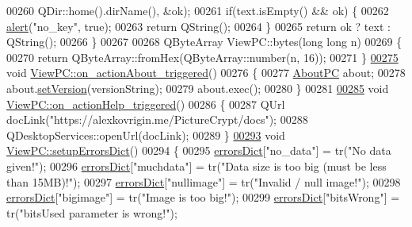 \begin{DoxyCode}
00260                                          QDir::home().dirName(), &ok);
00261     \textcolor{keywordflow}{if}(text.isEmpty() && ok) \{
00262         \hyperlink{class_view_p_c_a7c467169467789561078abc9d4fe57bd}{alert}(\textcolor{stringliteral}{"no\_key"}, \textcolor{keyword}{true});
00263         \textcolor{keywordflow}{return} QString();
00264     \}
00265     \textcolor{keywordflow}{return} ok ? text : QString();
00266 \}
00267 
00268 QByteArray ViewPC::bytes(\textcolor{keywordtype}{long} \textcolor{keywordtype}{long} n)
00269 \{
00270     \textcolor{keywordflow}{return} QByteArray::fromHex(QByteArray::number(n, 16));
00271 \}
\hypertarget{viewpc_8cpp_source.tex_l00275}{}\hyperlink{class_view_p_c_a09a46da4d492eb3dde88f35dc58c997b}{00275} \textcolor{keywordtype}{void} \hyperlink{class_view_p_c_a09a46da4d492eb3dde88f35dc58c997b}{ViewPC::on\_actionAbout\_triggered}()
00276 \{
00277     \hyperlink{class_about_p_c}{AboutPC} about;
00278     about.\hyperlink{class_about_p_c_aa3815d4826d0c8d87122449537a0a4d5}{setVersion}(versionString);
00279     about.exec();
00280 \}
00281 
\hypertarget{viewpc_8cpp_source.tex_l00285}{}\hyperlink{class_view_p_c_a0d252ff4829260c6c76769fbd24b7cd7}{00285} \textcolor{keywordtype}{void} \hyperlink{class_view_p_c_a0d252ff4829260c6c76769fbd24b7cd7}{ViewPC::on\_actionHelp\_triggered}()
00286 \{
00287     QUrl docLink(\textcolor{stringliteral}{"https://alexkovrigin.me/PictureCrypt/docs"});
00288     QDesktopServices::openUrl(docLink);
00289 \}
\hypertarget{viewpc_8cpp_source.tex_l00293}{}\hyperlink{class_view_p_c_a89236a0bb8760f02e984b85a8571934c}{00293} \textcolor{keywordtype}{void} \hyperlink{class_view_p_c_a89236a0bb8760f02e984b85a8571934c}{ViewPC::setupErrorsDict}()
00294 \{
00295     \hyperlink{class_view_p_c_aaf7f058e5589d65fec72a21abfd5629b}{errorsDict}[\textcolor{stringliteral}{"no\_data"}] = tr(\textcolor{stringliteral}{"No data given!"});
00296     \hyperlink{class_view_p_c_aaf7f058e5589d65fec72a21abfd5629b}{errorsDict}[\textcolor{stringliteral}{"muchdata"}] = tr(\textcolor{stringliteral}{"Data size is too big (must be less than 15MB)!"});
00297     \hyperlink{class_view_p_c_aaf7f058e5589d65fec72a21abfd5629b}{errorsDict}[\textcolor{stringliteral}{"nullimage"}] = tr(\textcolor{stringliteral}{"Invalid / null image!"});
00298     \hyperlink{class_view_p_c_aaf7f058e5589d65fec72a21abfd5629b}{errorsDict}[\textcolor{stringliteral}{"bigimage"}] = tr(\textcolor{stringliteral}{"Image is too big!"});
00299     \hyperlink{class_view_p_c_aaf7f058e5589d65fec72a21abfd5629b}{errorsDict}[\textcolor{stringliteral}{"bitsWrong"}] = tr(\textcolor{stringliteral}{"bitsUsed parameter is wrong!"});

\end{DoxyCode}
